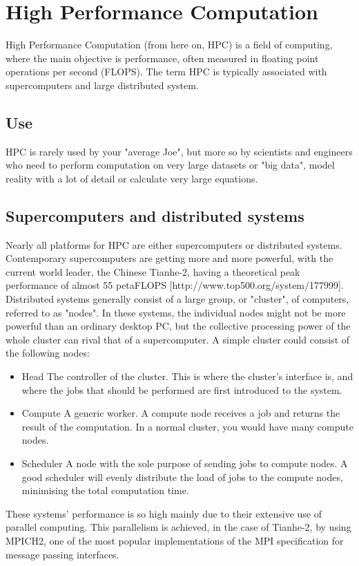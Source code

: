 \chapter{High Performance Computation}
High Performance Computation (from here on, HPC) is a field of computing, where the main objective is performance, often measured in floating point operations per second (FLOPS). The term HPC is typically associated with supercomputers and large distributed system.

\section{Use}
HPC is rarely used by your "average Joe", but more so by scientists and engineers who need to perform computation on very large datasets or "big data", model reality with a lot of detail or calculate very large equations.

\section{Supercomputers and distributed systems}
Nearly all platforms for HPC are either supercomputers or distributed systems. Contemporary supercomputers are getting more and more powerful, with the current world leader, the Chinese Tianhe-2, having a theoretical peak performance of almost 55 petaFLOPS [http://www.top500.org/system/177999]. 
Distributed systems generally consist of a large group, or "cluster", of computers, referred to as "nodes". In these systems, the individual nodes might not be more powerful than an ordinary desktop PC, but the collective processing power of the whole cluster can rival that of a supercomputer. 
A simple cluster could consist of the following nodes:
\begin{itemize}
	\item Head
	The controller of the cluster. This is where the cluster's interface is, and where the jobs that should be performed are first introduced to the system.
	\item Compute
	A generic worker. A compute node receives a job and returns the result of the computation. In a normal cluster, you would have many compute nodes.
	\item Scheduler
	A node with the sole purpose of sending jobs to compute nodes. A good scheduler will evenly distribute the load of jobs to the compute nodes, minimising the total computation time.
\end{itemize}

These systems' performance is so high mainly due to their extensive use of parallel computing. This parallelism is achieved, in the case of Tianhe-2, by using MPICH2, one of the most popular implementations of the MPI specification for message passing interfaces.

